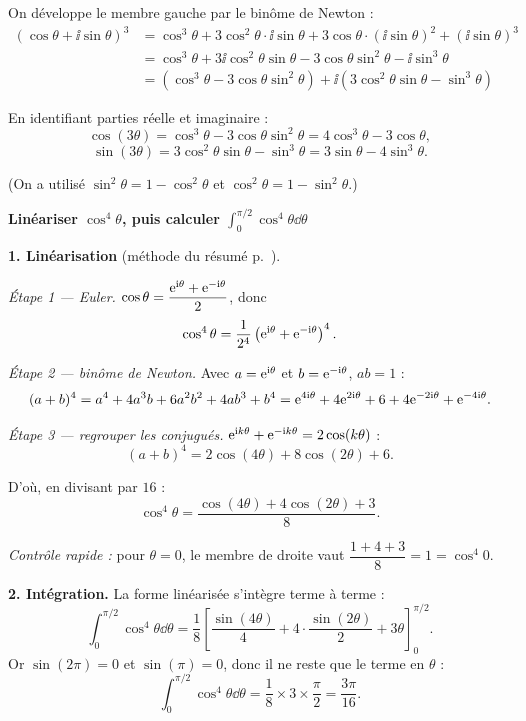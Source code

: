 On développe le membre gauche par le binôme de Newton :
$$
\begin{aligned}
	(\cos\theta + \ii\sin\theta)^3
	&= \cos^3\theta + 3\cos^2\theta\cdot\ii\sin\theta
	 + 3\cos\theta\cdot(\ii\sin\theta)^2 + (\ii\sin\theta)^3\\
	&= \cos^3\theta + 3\ii\cos^2\theta\sin\theta
	 - 3\cos\theta\sin^2\theta - \ii\sin^3\theta\\
	&= \left(\cos^3\theta - 3\cos\theta\sin^2\theta\right)
	 + \ii\left(3\cos^2\theta\sin\theta - \sin^3\theta\right)
\end{aligned}
$$

En identifiant parties réelle et imaginaire :
$$
\boxed{\cos(3\theta) = \cos^3\theta - 3\cos\theta\sin^2\theta = 4\cos^3\theta - 3\cos\theta,}
$$
$$
\boxed{\sin(3\theta) = 3\cos^2\theta\sin\theta - \sin^3\theta = 3\sin\theta - 4\sin^3\theta.}
$$

(On a utilisé $\sin^2\theta = 1 - \cos^2\theta$ et $\cos^2\theta = 1 - \sin^2\theta$.)



\exerciceresolu
\textbf{Linéariser $\cos^4\theta$, puis calculer $\displaystyle\int_0^{\pi/2}\cos^4\theta\dd\theta$}

\solution

\textbf{1. Linéarisation} (méthode du résumé p.~\pageref{res:cplx_linear}).

\emph{Étape 1 — Euler.} $\cos\theta = \dfrac{\mathrm{e}^{\mathrm{i}\theta}+\mathrm{e}^{-\mathrm{i}\theta}}{2}$, donc
$$
\cos^4\theta = \frac{1}{2^4}\left(\mathrm{e}^{\mathrm{i}\theta}+\mathrm{e}^{-\mathrm{i}\theta}\right)^{4}.
$$

\emph{Étape 2 — binôme de Newton.} Avec $a = \mathrm{e}^{\mathrm{i}\theta}$ et $b = \mathrm{e}^{-\mathrm{i}\theta}$,
$ab = 1$ :
$$
(a+b)^4 = a^4 + 4a^3b + 6a^2b^2 + 4ab^3 + b^4
= \mathrm{e}^{4\mathrm{i}\theta} + 4\mathrm{e}^{2\mathrm{i}\theta} + 6 + 4\mathrm{e}^{-2\mathrm{i}\theta} + \mathrm{e}^{-4\mathrm{i}\theta}.
$$

\emph{Étape 3 — regrouper les conjugués.} $\mathrm{e}^{\mathrm{i} k\theta} + \mathrm{e}^{-\mathrm{i} k\theta} = 2\cos(k\theta)$ :
$$
(a+b)^4 = 2\cos(4\theta) + 8\cos(2\theta) + 6.
$$

D'où, en divisant par $16$ :
$$
\boxed{\cos^4\theta = \frac{\cos(4\theta) + 4\cos(2\theta) + 3}{8}.}
$$

\emph{Contrôle rapide :} pour $\theta = 0$, le membre de droite vaut
$\dfrac{1+4+3}{8} = 1 = \cos^4 0$. \checkmark

\textbf{2. Intégration.} La forme linéarisée s'intègre terme à terme :
$$
\int_0^{\pi/2}\cos^4\theta\dd\theta
= \frac{1}{8}\left[\frac{\sin(4\theta)}{4} + 4\cdot\frac{\sin(2\theta)}{2}
+ 3\theta\right]_0^{\pi/2}.
$$
Or $\sin(2\pi) = 0$ et $\sin(\pi) = 0$, donc il ne reste que le terme en $\theta$ :
$$
\int_0^{\pi/2}\cos^4\theta\dd\theta = \frac{1}{8}\times 3\times\frac{\pi}{2}
= \frac{3\pi}{16}.
$$

